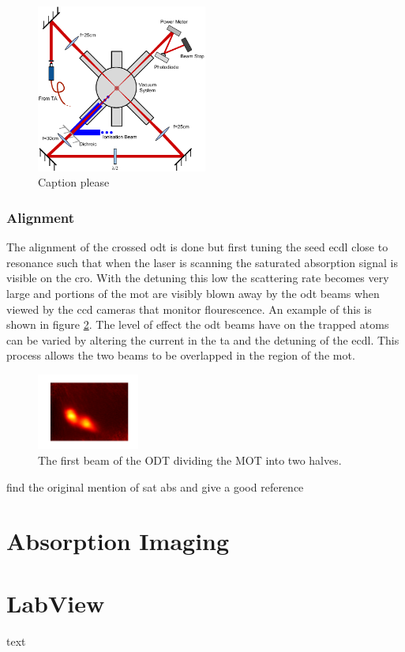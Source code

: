 \begin{figure}[h]
\centering
\includegraphics[width=0.5\textwidth]{figs/DipoleTrapRig.pdf}
\caption{{\color{red} Caption please}}
\label{fig:dipole_rig}
\end{figure}

\subsubsection{Alignment}

The alignment of the crossed \gls{odt} is done but first tuning the seed \gls{ecdl} close to resonance such that when the laser is scanning the saturated absorption signal is visible on the \gls{cro}. With the detuning this low the scattering rate becomes very large and portions of the \gls{mot} are visibly blown away by the \gls{odt} beams when viewed by the \gls{ccd} cameras that monitor flourescence. An example of this is shown in figure \ref{fig:mot_slice}. The level of effect the \gls{odt} beams have on the trapped atoms can be varied by altering the current in the \gls{ta} and the detuning of the \gls{ecdl}. This process allows the two beams to be overlapped in the region of the \gls{mot}.

\begin{figure}[h]
\centering
\includegraphics[width=0.3\textwidth]{figs/mot_slice.pdf}
\caption{The first beam of the ODT dividing the MOT into two halves.}
\label{fig:mot_slice}
\end{figure}

{\color{red} find the original mention of sat abs and give a good reference}

\section{Absorption Imaging}



\section{LabView}
text
